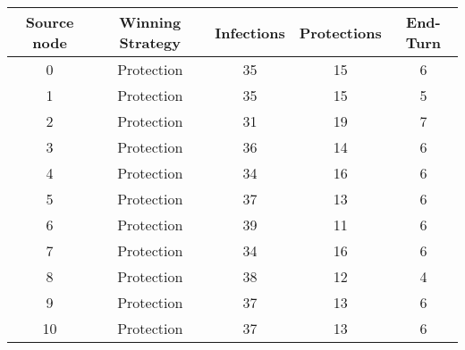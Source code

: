 \documentclass[results.tex]{subfiles}
\begin{document}
    \begin{center}
        \begin{tabular}{| c || c | c | c | c |}
            \hline
            {\bfseries Source node} & {\bfseries Winning Strategy} & {\bfseries Infections} & {\bfseries Protections}
            & {\bfseries End-Turn}
            \\  %
            \hline\hline
            0                       & Protection                   & 35                     & 15                      & 6                    \\
            \hline
            1                       & Protection                   & 35                     & 15                      & 5                    \\
            \hline
            2                       & Protection                   & 31                     & 19                      & 7                    \\
            \hline
            3                       & Protection                   & 36                     & 14                      & 6                    \\
            \hline
            4                       & Protection                   & 34                     & 16                      & 6                    \\
            \hline
            5                       & Protection                   & 37                     & 13                      & 6                    \\
            \hline
            6                       & Protection                   & 39                     & 11                      & 6                    \\
            \hline
            7                       & Protection                   & 34                     & 16                      & 6                    \\
            \hline
            8                       & Protection                   & 38                     & 12                      & 4                    \\
            \hline
            9                       & Protection                   & 37                     & 13                      & 6                    \\
            \hline
            10                      & Protection                   & 37                     & 13                      & 6                    \\

\end{tabular}
\end{center}
\end{document}
